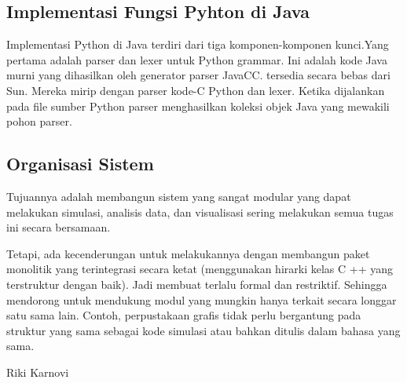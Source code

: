 \documentclass[12pt,a4paper]{article}
\begin{document}
\subsection{Implementasi Fungsi Pyhton di Java}

Implementasi Python di Java terdiri dari tiga komponen-komponen kunci.Yang pertama adalah parser dan lexer untuk Python grammar. Ini adalah kode Java murni yang dihasilkan oleh generator parser JavaCC. tersedia secara bebas dari Sun. Mereka mirip dengan parser kode-C Python dan lexer. Ketika dijalankan pada file sumber Python parser menghasilkan koleksi objek Java yang mewakili pohon parser.

\subsection{Organisasi Sistem}

Tujuannya adalah membangun sistem yang sangat modular yang dapat melakukan simulasi, analisis data, dan visualisasi sering melakukan semua tugas ini secara bersamaan. 

Tetapi, ada kecenderungan untuk melakukannya dengan membangun paket monolitik yang terintegrasi secara ketat (menggunakan hirarki kelas C ++ yang terstruktur dengan baik). Jadi membuat  terlalu formal dan restriktif.  Sehingga mendorong untuk mendukung modul yang mungkin hanya terkait secara longgar satu sama lain. Contoh, perpustakaan grafis tidak perlu bergantung pada struktur yang sama sebagai kode simulasi atau bahkan ditulis dalam bahasa yang sama.

Riki Karnovi
\end{document}
